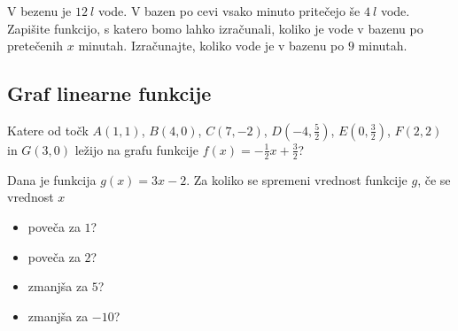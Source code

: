             \begin{naloga}
                V bezenu je $12~l$ vode. V bazen po cevi vsako minuto pritečejo še $4~l$ vode.
                Zapišite funkcijo, s katero bomo lahko izračunali, koliko je vode v bazenu po pretečenih $x$ minutah.
                Izračunajte, koliko vode je v bazenu po $9$ minutah. 
            \end{naloga}


        












    \subsection{Graf linearne funkcije}



        
            \begin{naloga}
                Katere od točk $A(1,1)$, $B(4,0)$, $C(7,-2)$, $D(-4,\frac{5}{2})$, $E(0,\frac{3}{2})$, $F(2,2)$ in $G(3,0)$ ležijo na grafu funkcije $f(x)=-\frac{1}{2}x+\frac{3}{2}$? 
            \end{naloga}

            \begin{naloga}
                Dana je funkcija $g(x)=3x-2$. Za koliko se spremeni vrednost funkcije $g$, če se vrednost $x$
                \begin{itemize}
                    \item poveča za $1$?
                    \item poveča za $2$?
                    \item zmanjša za $5$?
                    \item zmanjša za $-10$?
                \end{itemize} 
            \end{naloga}

        



